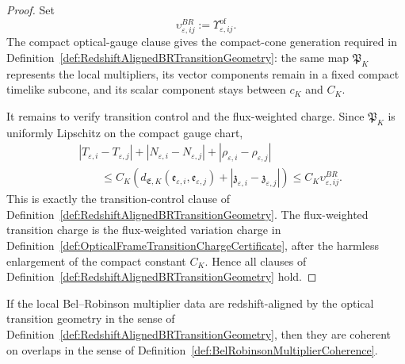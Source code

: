 \begin{proof}
Set
\[
    \upsilon^{BR}_{\varepsilon,ij}
    :=
    \Upsilon^{\mathrm{of}}_{\varepsilon,ij}.
\]
The compact optical-gauge clause gives the compact-cone generation required in Definition~\ref{def:RedshiftAlignedBRTransitionGeometry}: the same map $\mathfrak P_K$ represents the local multipliers, its vector components remain in a fixed compact timelike subcone, and its scalar component stays between $c_K$ and $C_K$.

It remains to verify transition control and the flux-weighted charge.  Since $\mathfrak P_K$ is uniformly Lipschitz on the compact gauge chart,
\[
\begin{split}
    &|T_{\varepsilon,i}-T_{\varepsilon,j}|
    +
    |N_{\varepsilon,i}-N_{\varepsilon,j}|
    +
    |\rho_{\varepsilon,i}-\rho_{\varepsilon,j}| \\
    &\qquad\le
    C_K\left(
        d_{\mathfrak E,K}(\mathfrak e_{\varepsilon,i},\mathfrak e_{\varepsilon,j})
        +
        |\mathfrak z_{\varepsilon,i}-\mathfrak z_{\varepsilon,j}|
    \right)
    \le
    C_K\upsilon^{BR}_{\varepsilon,ij}.
\end{split}
\]
This is exactly the transition-control clause of Definition~\ref{def:RedshiftAlignedBRTransitionGeometry}.  The flux-weighted transition charge is the flux-weighted variation charge in Definition~\ref{def:OpticalFrameTransitionChargeCertificate}, after the harmless enlargement of the compact constant $C_K$.  Hence all clauses of Definition~\ref{def:RedshiftAlignedBRTransitionGeometry} hold.
\end{proof}

\begin{theorem}\label{thm:RedshiftAlignedTransitionsGiveCoherence}
If the local Bel--Robinson multiplier data are redshift-aligned by the optical transition geometry in the sense of Definition~\ref{def:RedshiftAlignedBRTransitionGeometry}, then they are coherent on overlaps in the sense of Definition~\ref{def:BelRobinsonMultiplierCoherence}.
\end{theorem}

